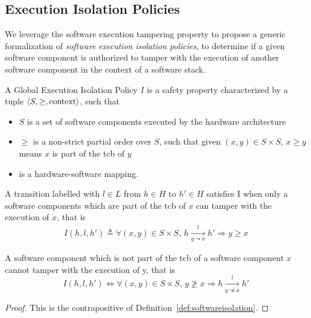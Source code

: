 \subsection{Execution Isolation Policies}
\label{subsec:speccert:globalsec}

We leverage the software execution tampering property to propose a generic
formalization of \emph{software execution isolation policies}, to determine if a
given software component is authorized to tamper with the execution of another
software component in the context of a software stack.

\begin{definition}
  \label{def:speccert:global}
  A Global Execution Isolation Policy $I$ is a safety property characterized by
  a tuple $\langle S, \ge, \mathrm{context} \rangle$, such that
  \begin{itemize}
  \item $S$ is a set of software components executed by the hardware
    architecture
  \item $\ge$ is a non-strict partial order over $S$, such that given
    $(x, y) \in S \times S$, $x \ge y$ means $x$ is part of the \ac{tcb} of $y$
  \item {} is a hardware-software mapping.
  \end{itemize}

  A transition labelled with $l \in L$ from $h \in H$ to $h' \in H$ satisfies I
  when only a software components which are part of the \ac{tcb} of $x$ can
  tamper with the execution of $x$, that is
  \[
    \begin{array}{l}
      I(h, l, h') \triangleq
      \forall (x, y) \in S \times S \text{, } h \xrightarrow[y
      \leadsto x]{l} h' \Rightarrow y \ge x
    \end{array}
  \]
\end{definition}

\begin{corollary}
  A software component which is not part of the \ac{tcb} of a software component
  $x$ cannot tamper with the execution of y, that is
  \[
    I(h, l, h') \iff \forall (x, y) \in S \times S \text{, } y \not\ge x
    \Rightarrow h \xrightarrow[y \not\leadsto x]{l} h'
  \]

  \begin{proof}
    This is the contrapositive of Definition~\ref{def:softwareisolation}.
  \end{proof}
\end{corollary}

